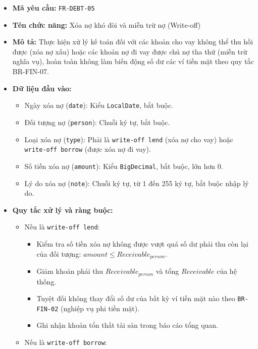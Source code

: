 \documentclass[11pt,a4paper]{article}
\providecommand{\tightlist}{
  \setlength{\itemsep}{0pt}\setlength{\parskip}{0pt}}
\begin{document}
\begin{itemize}
\tightlist
\item
  \textbf{Mã yêu cầu:} \texttt{FR-DEBT-05}
\item
  \textbf{Tên chức năng:} Xóa nợ khó đòi và miễn trừ nợ (Write-off)
\item
  \textbf{Mô tả:} Thực hiện xử lý kế toán đối với các khoản cho vay
  không thể thu hồi được (xóa nợ xấu) hoặc các khoản nợ đi vay được chủ
  nợ tha thứ (miễn trừ nghĩa vụ), hoàn toàn không làm biến động số dư
  các ví tiền mặt theo quy tắc BR-FIN-07.
\item
  \textbf{Dữ liệu đầu vào:}

  \begin{itemize}
  \tightlist
  \item
    Ngày xóa nợ (\texttt{date}): Kiểu \texttt{LocalDate}, bắt buộc.
  \item
    Đối tượng nợ (\texttt{person}): Chuỗi ký tự, bắt buộc.
  \item
    Loại xóa nợ (\texttt{type}): Phải là \texttt{write-off\ lend} (xóa
    nợ cho vay) hoặc \texttt{write-off\ borrow} (được xóa nợ đi vay).
  \item
    Số tiền xóa nợ (\texttt{amount}): Kiểu \texttt{BigDecimal}, bắt
    buộc, lớn hơn 0.
  \item
    Lý do xóa nợ (\texttt{note}): Chuỗi ký tự, từ 1 đến 255 ký tự, bắt
    buộc nhập lý do.
  \end{itemize}
\item
  \textbf{Quy tắc xử lý và ràng buộc:}

  \begin{itemize}
  \tightlist
  \item
    Nếu là \texttt{write-off\ lend}:

    \begin{itemize}
    \tightlist
    \item
      Kiểm tra số tiền xóa nợ không được vượt quá số dư phải thu còn lại
      của đối tượng: \(amount \le Receivable_{person}\).
    \item
      Giảm khoản phải thu \(Receivable_{person}\) và tổng \(Receivable\)
      của hệ thống.
    \item
      Tuyệt đối không thay đổi số dư của bất kỳ ví tiền mặt nào theo
      \texttt{BR-FIN-02} (nghiệp vụ phi tiền mặt).
    \item
      Ghi nhận khoản tổn thất tài sản trong báo cáo tổng quan.
    \end{itemize}
  \item
    Nếu là \texttt{write-off\ borrow}:


\end{itemize}
\end{itemize}
\end{document}
